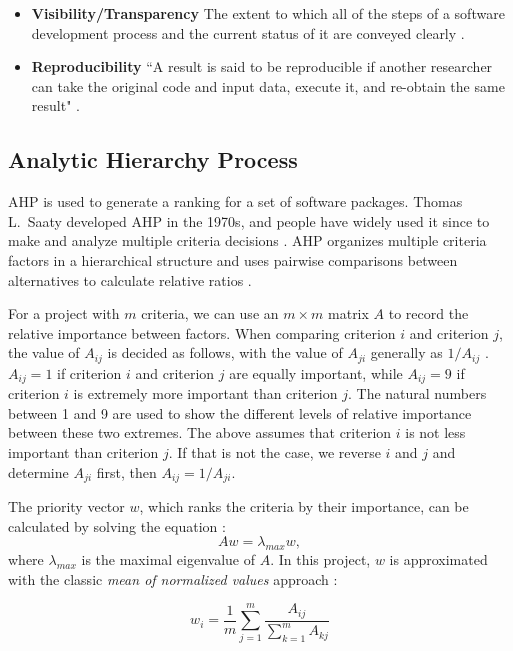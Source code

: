 \documentclass[3p, 12pt,authoryear]{elsarticle}
\begin{document}
\begin{itemize}
	\item \textbf{Visibility/Transparency} The extent to which all of the steps
	of a software development process and the current status of it are conveyed
	clearly \citep{ghezzi1991fundamentals}.

	\item \textbf{Reproducibility} ``A result is said to be reproducible if
	another researcher can take the original code and input data, execute it,
	and re-obtain the same result" \citep{BenureauAndRougier2017}.
\end{itemize}

\subsection{Analytic Hierarchy Process} \label{sec_AHP}

AHP is used to generate a ranking for a set of software packages. Thomas L.\
Saaty developed AHP in the 1970s, and people have widely used it since to make
and analyze multiple criteria decisions \citep{VaidyaEtAl2006}. AHP organizes
multiple criteria factors in a hierarchical structure and uses pairwise
comparisons between alternatives to calculate relative ratios \citep{Saaty1990}.

For a project with $m$ criteria, we can use an $m\times m$ matrix $A$ to record
the relative importance between factors. When comparing criterion $i$ and
criterion $j$, the value of $A_{ij}$ is decided as follows, with the value of
$A_{ji}$ generally as $1/A_{ij}$ \citep{Saaty1990}.  $A_{ij} = 1$ if criterion
$i$ and criterion $j$ are equally important, while $A_{ij} = 9$ if criterion $i$
is extremely more important than criterion $j$.  The natural numbers between 1
and 9 are used to show the different levels of relative importance between these
two extremes. The above assumes that criterion $i$ is not less important than
criterion $j$.  If that is not the case, we reverse $i$ and $j$ and determine
$A_{ji}$ first, then $A_{ij} = 1/A_{ji}$.

The priority vector $w$, which ranks the criteria by their importance, can be
calculated by solving the equation \citep{Saaty1990}:
\begin{equation} 
    A w = \lambda_{max} w,
\end{equation}
where $\lambda_{max}$ is the maximal eigenvalue of $A$.  In this project, $w$ is
approximated with the classic \textit{mean of normalized values} approach
\citep{AlessioEtAl2006}:

\begin{equation}
w_i = \frac{1}{m}\sum_{j=1}^{m}\frac{A_{ij}}{\sum_{k=1}^{m}A_{kj}}
\end{equation}
\end{document}
